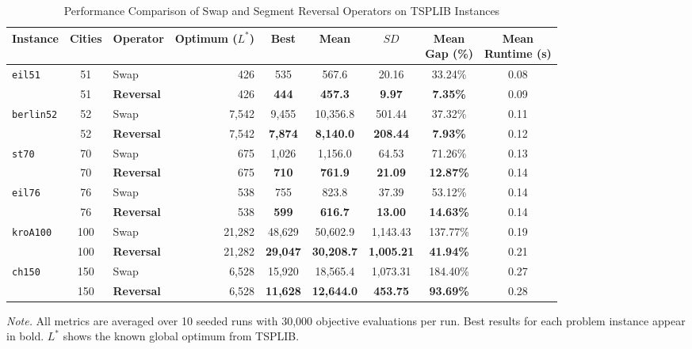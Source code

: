 \begin{table}[H]
\caption{Performance Comparison of Swap and Segment Reversal Operators on TSPLIB Instances}
\label{tab:summary_statistics}
\begin{threeparttable}
\small
\setlength{\tabcolsep}{4pt}
\begin{tabular}{lclrccccc}
\toprule
Instance & Cities & Operator & \shortstack[c]{Optimum\\(\(L^*\))} & Best & Mean & \(SD\) & \shortstack[c]{Mean\\Gap (\%)} & \shortstack[c]{Mean\\Runtime (s)} \\
\midrule
\texttt{eil51} & 51 & Swap & 426 & 535 & 567.6 & 20.16 & 33.24\% & 0.08 \\
 & 51 & \textbf{Reversal} & 426 & \textbf{444} & \textbf{457.3} & \textbf{9.97} & \textbf{7.35\%} & 0.09 \\
\addlinespace
\texttt{berlin52} & 52 & Swap & 7,542 & 9,455 & 10,356.8 & 501.44 & 37.32\% & 0.11 \\
 & 52 & \textbf{Reversal} & 7,542 & \textbf{7,874} & \textbf{8,140.0} & \textbf{208.44} & \textbf{7.93\%} & 0.12 \\
\addlinespace
\texttt{st70} & 70 & Swap & 675 & 1,026 & 1,156.0 & 64.53 & 71.26\% & 0.13 \\
 & 70 & \textbf{Reversal} & 675 & \textbf{710} & \textbf{761.9} & \textbf{21.09} & \textbf{12.87\%} & 0.14 \\
\addlinespace
\texttt{eil76} & 76 & Swap & 538 & 755 & 823.8 & 37.39 & 53.12\% & 0.14 \\
 & 76 & \textbf{Reversal} & 538 & \textbf{599} & \textbf{616.7} & \textbf{13.00} & \textbf{14.63\%} & 0.14 \\
\addlinespace
\texttt{kroA100} & 100 & Swap & 21,282 & 48,629 & 50,602.9 & 1,143.43 & 137.77\% & 0.19 \\
 & 100 & \textbf{Reversal} & 21,282 & \textbf{29,047} & \textbf{30,208.7} & \textbf{1,005.21} & \textbf{41.94\%} & 0.21 \\
\addlinespace
\texttt{ch150} & 150 & Swap & 6,528 & 15,920 & 18,565.4 & 1,073.31 & 184.40\% & 0.27 \\
 & 150 & \textbf{Reversal} & 6,528 & \textbf{11,628} & \textbf{12,644.0} & \textbf{453.75} & \textbf{93.69\%} & 0.28 \\
\bottomrule
\end{tabular}
\begin{tablenotes}[flushleft]
\small
\item \textit{Note.} All metrics are averaged over 10 seeded runs with 30,000 objective evaluations per run. Best results for each problem instance appear in bold. \(L^*\) shows the known global optimum from TSPLIB.
\end{tablenotes}
\end{threeparttable}
\end{table}


